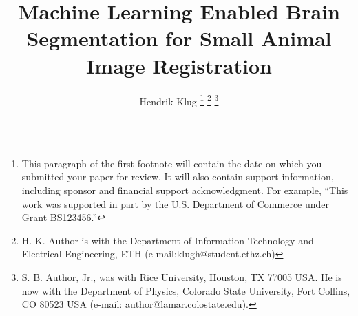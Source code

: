 \documentclass[journal,twoside,web,english]{ieeecolor}
\title{Machine Learning Enabled Brain Segmentation for Small Animal Image Registration}
\author{
	Hendrik Klug
	\newline
\thanks{This paragraph of the first footnote will contain the date on which
you submitted your paper for review. It will also contain support information,
including sponsor and financial support acknowledgment. For example,
``This work was supported in part by the U.S. Department of Commerce under Grant BS123456.'' }
\thanks{H. K. Author is with the Department of Information Technology and Electrical Engineering, ETH (e-mail:klugh@student.ethz.ch)}
\thanks{S. B. Author, Jr., was with Rice University, Houston, TX 77005 USA.
He is now with the Department of Physics, Colorado State University,
Fort Collins, CO 80523 USA (e-mail: author@lamar.colostate.edu).}}
\date{}
\begin{document}
\maketitle
\noindent










\clearpage

%
\end{document}

